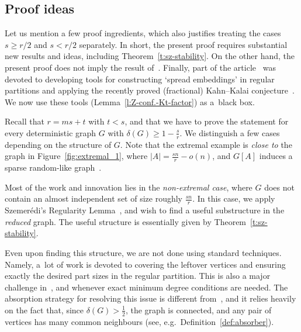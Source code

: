 \documentclass[reqno, 12pt]{amsart}
\numberwithin{equation}{section}
\numberwithin{figure}{section}
\theoremstyle{plain}
\theoremstyle{definition}
\def\sa#1{\textcolor{cyan}{#1}}
\begin{document}




    
    \subsection*{Proof ideas} 
    Let us mention a few proof ingredients, which also justifies treating the cases $s \geq r/2$ and $s< r/2$ separately. In short, the present proof requires substantial new results and ideas, including Theorem~\ref{t:sz-stability}. On the other hand, the present proof does not imply the result of~\cite{akr24}. Finally, part of the article~\cite{akr24} was devoted to developing tools for constructing `spread embeddings' in regular partitions and applying the recently proved (fractional) Kahn--Kalai conjecture~\cite{fknp21,pp24}. We now use these tools (Lemma~\ref{l:Z-conf.-Kt-factor}) as a~black box.

    Recall that $r = ms+t$ with $t<s$, and that we have to prove the statement for every deterministic graph $G$ with $\delta(G) \geq 1 - \frac sr$. We distinguish a few cases depending on the structure of $G$. Note that the extremal example is \textit{close to} the graph in Figure~\ref{fig:extremal_1}, where $|A| = \frac{sn}{r}-o(n)$, and $G[A]$ induces a sparse random-like graph~\cite{akr24}. %

    Most of the work and innovation lies in the \textit{non-extremal case}, where $G$ does not contain an almost independent set of size roughly $\frac{sn}{r}$. In this case, we apply Szemer\'edi's Regularity Lemma~\cite{szemeredi78}, and wish to find a useful substructure in the \textit{reduced} graph. The useful structure is essentially given by Theorem~\ref{t:sz-stability}.

    Even upon finding this structure, we are not done using standard techniques. Namely, a~lot of work is devoted to covering the leftover vertices and ensuring exactly the desired part sizes in the regular partition. This is also a major challenge in~\cite{bpss23,akr24}, and whenever exact minimum degree conditions are needed. The absorption strategy for resolving this issue is different from~\cite{akr24}, and it relies heavily on the fact that, since $\delta(G) > \frac 12$, the graph is connected, and any pair of vertices has many common neighbours (see, e.g.~Definition~\ref{def:absorber}).
\end{document}
